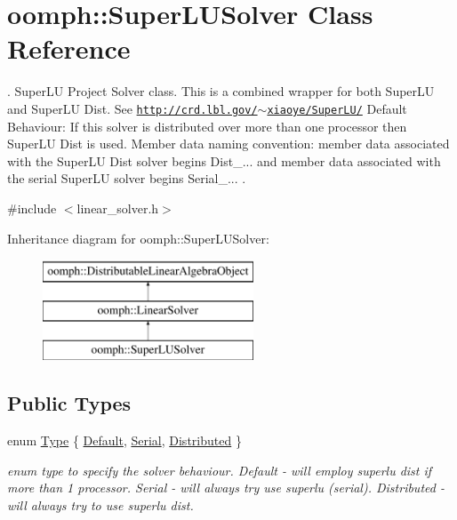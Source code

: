 \hypertarget{classoomph_1_1SuperLUSolver}{}\section{oomph\+:\+:Super\+L\+U\+Solver Class Reference}
\label{classoomph_1_1SuperLUSolver}


. Super\+LU Project Solver class. This is a combined wrapper for both Super\+LU and Super\+LU Dist. See \href{http://crd.lbl.gov/~xiaoye/SuperLU/}{\tt http\+://crd.\+lbl.\+gov/$\sim$xiaoye/\+Super\+L\+U/} Default Behaviour\+: If this solver is distributed over more than one processor then Super\+LU Dist is used. Member data naming convention\+: member data associated with the Super\+LU Dist solver begins Dist\+\_\+... and member data associated with the serial Super\+LU solver begins Serial\+\_\+... .  




{\ttfamily \#include $<$linear\+\_\+solver.\+h$>$}

Inheritance diagram for oomph\+:\+:Super\+L\+U\+Solver\+:\begin{figure}[H]
\begin{center}
\leavevmode
\includegraphics[height=3.000000cm]{classoomph_1_1SuperLUSolver}
\end{center}
\end{figure}
\subsection*{Public Types}
\begin{DoxyCompactItemize}
\item 
enum \hyperlink{classoomph_1_1SuperLUSolver_a55d3709b5e082ecce2b41f9db6716e1a}{Type} \{ \hyperlink{classoomph_1_1SuperLUSolver_a55d3709b5e082ecce2b41f9db6716e1aa899bf1bf033b5c6dbc7a3479a5a650fc}{Default}, 
\hyperlink{classoomph_1_1SuperLUSolver_a55d3709b5e082ecce2b41f9db6716e1aa80ab98447db39df77743bc5711d9e5d7}{Serial}, 
\hyperlink{classoomph_1_1SuperLUSolver_a55d3709b5e082ecce2b41f9db6716e1aa2fe10e60579b07a72fe0126f06e820ce}{Distributed}
 \}\begin{DoxyCompactList}\small\item\em enum type to specify the solver behaviour. Default -\/ will employ superlu dist if more than 1 processor. Serial -\/ will always try use superlu (serial). Distributed -\/ will always try to use superlu dist. \end{DoxyCompactList}
\end{DoxyCompactItemize}
